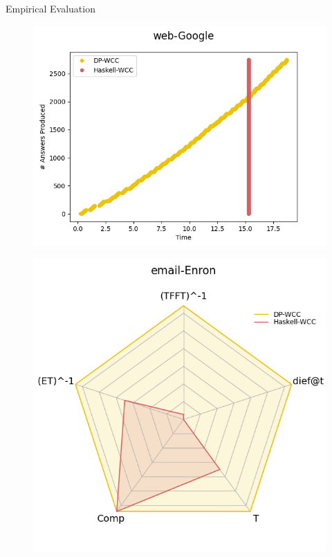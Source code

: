 \documentclass{beamer}
\begin{document}
\begin{frame}[fragile]{Empirical Evaluation}
\begin{figure}[!htb]
\begin{minipage}{0.33\textwidth}
         \includegraphics[width=1\linewidth, height=0.4\textheight]{web_google}
        \end{minipage}
    \end{figure}
  \begin{figure}[!htb]
      \centering
      \begin{minipage}{0.33\textwidth}
       \includegraphics[width=1\linewidth, height=0.35\textheight]{email_enron_radar}
      \end{minipage}%

\end{figure}
\end{frame}
\end{document}
